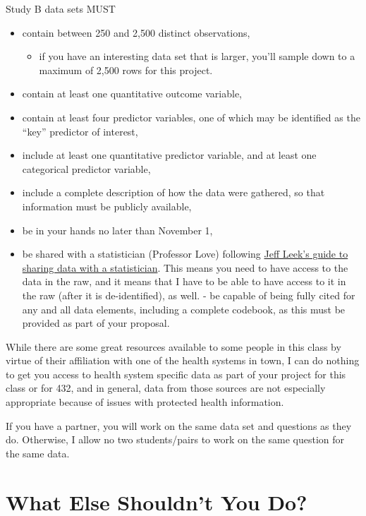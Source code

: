 \documentclass[]{book}
\providecommand{\tightlist}{%
  \setlength{\itemsep}{0pt}\setlength{\parskip}{0pt}}
\begin{document}
Study B data sets MUST

\begin{itemize}
\tightlist
\item
  contain between 250 and 2,500 distinct observations,

  \begin{itemize}
  \tightlist
  \item
    if you have an interesting data set that is larger, you'll sample down to a maximum of 2,500 rows for this project.
  \end{itemize}
\item
  contain at least one quantitative outcome variable,
\item
  contain at least four predictor variables, one of which may be identified as the ``key'' predictor of interest,
\item
  include at least one quantitative predictor variable, and at least one categorical predictor variable,
\item
  include a complete description of how the data were gathered, so that information must be publicly available,
\item
  be in your hands no later than November 1,
\item
  be shared with a statistician (Professor Love) following \href{https://github.com/jtleek/datasharing}{Jeff Leek's guide to sharing data with a statistician}. This means you need to have access to the data in the raw, and it means that I have to be able to have access to it in the raw (after it is de-identified), as well. - be capable of being fully cited for any and all data elements, including a complete codebook, as this must be provided as part of your proposal.
\end{itemize}

While there are some great resources available to some people in this class by virtue of their affiliation with one of the health systems in town, I can do nothing to get you access to health system specific data as part of your project for this class or for 432, and in general, data from those sources are not especially appropriate because of issues with protected health information.

If you have a partner, you will work on the same data set and questions as they do. Otherwise, I allow no two students/pairs to work on the same question for the same data.

\hypertarget{what-else-shouldnt-you-do}{%
\section{What Else Shouldn't You Do?}\label{what-else-shouldnt-you-do}}
\end{document}
